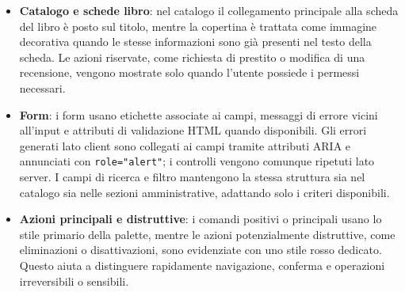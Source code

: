 ﻿\documentclass{article}
\begin{document}
\begin{itemize}
    \item \textbf{Catalogo e schede libro}: nel catalogo il collegamento principale alla scheda del libro è posto sul titolo, mentre la copertina è trattata come immagine decorativa quando le stesse informazioni sono già presenti nel testo della scheda. Le azioni riservate, come richiesta di prestito o modifica di una recensione, vengono mostrate solo quando l'utente possiede i permessi necessari.
    \item \textbf{Form}: i form usano etichette associate ai campi, messaggi di errore vicini all'input e attributi di validazione HTML quando disponibili. Gli errori generati lato client sono collegati ai campi tramite attributi ARIA e annunciati con \texttt{role="alert"}; i controlli vengono comunque ripetuti lato server. I campi di ricerca e filtro mantengono la stessa struttura sia nel catalogo sia nelle sezioni amministrative, adattando solo i criteri disponibili.
    \item \textbf{Azioni principali e distruttive}: i comandi positivi o principali usano lo stile primario della palette, mentre le azioni potenzialmente distruttive, come eliminazioni o disattivazioni, sono evidenziate con uno stile rosso dedicato. Questo aiuta a distinguere rapidamente navigazione, conferma e operazioni irreversibili o sensibili.
\end{itemize}

\newpage
\end{document}
